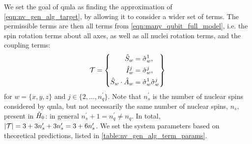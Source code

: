 We set the goal of \gls{qmla} as finding the approximation of \cref{eqn:nv_gen_alg_target},
    by allowing it to consider a wider set of terms. 
The permissible terms are then all terms from \cref{eqn:many_qubit_full_model}, 
    i.e. the spin rotation terms about all axes, 
    as well as all nuclei rotation terms, and the coupling terms:
\begin{equation}
    \mathcal{T} = \left\{ 
        \begin{split}    
            \hat{S}_w &= \hat{\sigma}_w^{1}, \\
            \hat{I}_w^{j} &= \hat{\sigma}_w^{j}, \\
            \hat{S}_w \cdot \hat{A}_w &= \hat{\sigma}_w^1 \hat{\sigma}_w^j
        \end{split}
    \right\}
    \label{eqn:nv_ga_terms}
\end{equation}
    for $w=\{ x, y, z \}$ and $j \in \{ 2, ..., n_q^{\prime} \}$.
Note that $n_s^{\prime}$ is the number of nuclear spins considered by \gls{qmla}, but not necessarily the 
    same number of nuclear spins, $n_s$, present in $\hat{H}_0$:
    in general $n_s^{\prime}+1 = n_q^{\prime} \neq n_q$.
In total, $\left\lvert \mathcal{T} \right\rvert = 3 + 3n_s^{\prime} + 3 n_s^{\prime} = 3 + 6 n_s^{\prime}$. 
We set the system parameters based on theoretical predictions, listed in \cref{table:nv_gen_alg_term_params}.

